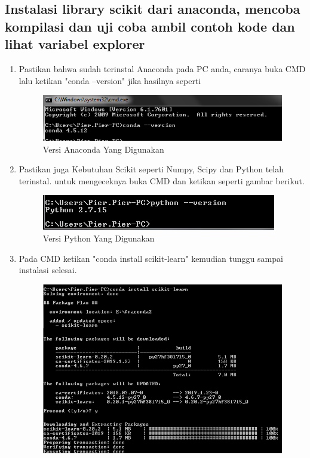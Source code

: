 \subsection{Instalasi library scikit dari anaconda, mencoba kompilasi dan uji coba ambil contoh kode dan lihat variabel explorer}
\begin{enumerate}
\item
Pastikan bahwa sudah terinstal Anaconda pada PC anda, caranya buka CMD lalu ketikan "conda --version" jika hasilnya seperti 
\begin{figure}
	\begin{center}
   	 \includegraphics[scale=1]{figures/versiconda.png}
   	 \caption{Versi Anaconda Yang Digunakan}	
	\end{center}
\end{figure}
\item
Pastikan juga Kebutuhan Scikit seperti Numpy, Scipy dan Python telah terinstal. untuk mengeceknya buka CMD dan ketikan seperti gambar berikut.
\begin{figure}
	\begin{center}
   	 \includegraphics[scale=1]{figures/gambar.png}
   	 \caption{Versi Python Yang Digunakan}	
	\end{center}
\end{figure}
\item 
Pada CMD ketikan "conda install scikit-learn" kemudian tunggu sampai instalasi selesai.
\begin{figure}[!htbp]
	\begin{center}
   	 \includegraphics[scale=1]{figures/instalscikit.png}

\end{center}
\end{figure}
\end{enumerate}
